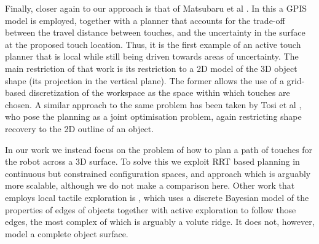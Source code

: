 Finally, closer again to our approach is that of Matsubaru et al \cite{matsubaru2016}. In this a GPIS model is employed, together with a planner that accounts for the trade-off between the travel distance between touches, and the uncertainty in the surface at the proposed touch location. Thus, it is the first example of an active touch planner that is local while still being driven towards areas of uncertainty. The main restriction of that work is its restriction to a 2D model of the 3D object shape (its projection in the vertical plane). The former allows the use of a grid-based discretization of the workspace as the space within which touches are chosen. A similar approach to the same problem has been taken by Tosi et al \cite{Tosi14}, who pose the planning as a joint optimisation problem, again restricting shape recovery to the 2D outline of an object.

In our work we instead focus on the problem of how to plan a path of touches for the robot across a 3D surface. To solve this we exploit RRT based planning in continuous but constrained configuration spaces, and approach which is arguably more scalable, although we do not make a comparison here. Other work that employs local tactile exploration is \cite{martinez17,lepora17}, which uses a discrete Bayesian model of the properties of edges of objects together with active exploration to follow those edges, the most complex of which is arguably a volute ridge. It does not, however, model a complete object surface.


